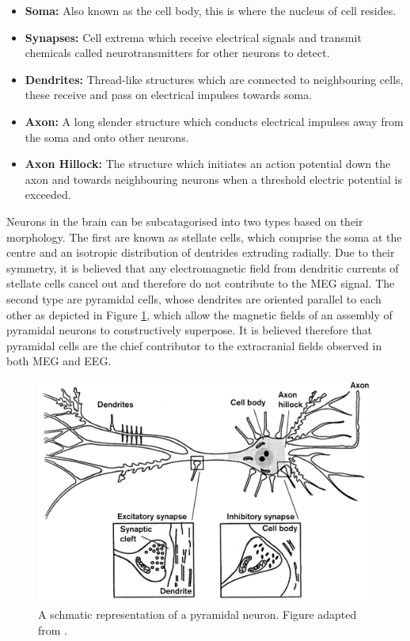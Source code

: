 \begin{itemize}
	\item \textbf{Soma:} Also known as the cell body, this is where the nucleus of cell resides.
	\item \textbf{Synapses:} Cell extrema which receive electrical signals and transmit chemicals called neurotransmitters for other neurons to detect. 
	\item \textbf{Dendrites:} Thread-like structures which are connected to neighbouring cells, these receive and pass on electrical impulses towards soma.
	\item \textbf{Axon:} A long slender structure which conducts electrical impulses away from the soma and onto other neurons. 
	\item \textbf{Axon Hillock:} The structure which initiates an action potential down the axon and towards neighbouring neurons when a threshold electric potential is exceeded.
\end{itemize} 

Neurons in the brain can be subcatagorised into two types based on their morphology. The first are known as stellate cells, which comprise the soma at the centre and an isotropic distribution of dentrides extruding radially. Due to their symmetry, it is believed that any electromagnetic field from dendritic currents of stellate cells cancel out and therefore do not contribute to the MEG signal. The second type are pyramidal cells, whose dendrites are oriented parallel to each other as depicted in Figure \ref{fig_1_b1}, which allow the magnetic fields of an assembly of pyramidal neurons to constructively superpose. It is believed therefore that pyramidal cells are the chief contributor to the extracranial fields observed in both MEG and EEG.

\begin{figure}[h!]
	\begin{center}
		\includegraphics[width=\linewidth]{./images/chapter1/neuron.png}\caption{A schmatic representation of a pyramidal neuron. Figure adapted from \cite{Hamalainen1993}.}\label{fig_1_b1}
	\end{center}
\end{figure}


